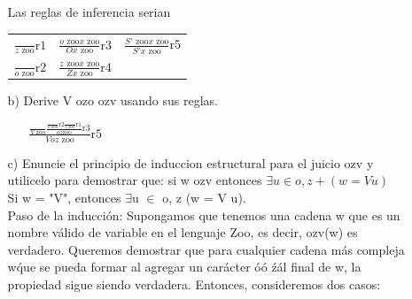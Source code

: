 \documentclass{article}
\begin{document}
\begin{itemize}
\begin{itemize}
                Las reglas de inferencia serian
                \begin{center}
                \LARGE
                    \begin{tabular}{|c c c|}
                        \hline
                        $\frac{}{z \text{ zoo}} \text{r1}$ & $\frac{o \text{ zoo} x \text{ zoo}}{Ox \text{ zoo}} \text{r3}$ & $\frac{S' \text{ zoo} x \text{ zoo}}{S'x \text{ zoo}} \text{r5}$ \\
                        $\frac{}{o \text{ zoo}} \text{r2}$ & $\frac{z \text{ zoo} x \text{ zoo}}{Zx \text{ zoo}} \text{r4}$ &  \\
                        \hline
                    \end{tabular}
                \end{center}

                \item[b)] Derive V ozo ozv usando sus reglas.
                    \begin{center}
                    \LARGE
                        \begin{itemize}

                            \item[ ] $\frac{\frac{}{V \text{ zoo}} \frac{\frac{}{o \text{ zoo}}\text{r2} \frac{}{z \text{ zoo}}\text{r1}}{oz \text{zoo}} \text{r3}} {Voz \text{ zoo}} \text{r5}$
                        \end{itemize}
                        
                                                
                    \end{center}
                \item[c)] Enuncie el principio de induccion estructural para el juicio ozv y utilicelo para demostrar que: si w ozv entonces $\exists u \in {o, z}+ (w = V u)$\\

                Si w = "V", entonces $\exists$u $\in$ o, z (w = V u).\\

                Paso de la inducción: Supongamos que tenemos una cadena w que es un nombre válido de variable en el lenguaje Zoo, es decir, ozv(w) es verdadero. Queremos demostrar que para cualquier cadena más compleja w\' que se pueda formar al agregar un carácter \'o\' o \'z\' al final de w, la propiedad sigue siendo verdadera. Entonces, consideremos dos casos:\\


\end{itemize}
\end{itemize}
\end{document}
